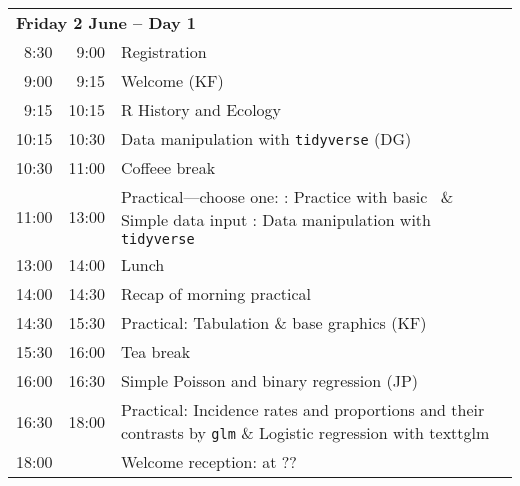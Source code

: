 \noindent
\begin{tabular}{r@{ -- }rp{13cm}}
\multicolumn{3}{l}{\bf Friday 2 June -- Day 1} \\
 8:30 &  9:00 & Registration \\
 9:00 &  9:15 & Welcome (KF) \\
 9:15 & 10:15 & R History and Ecology\\%
10:15 & 10:30 & Data manipulation with \texttt{tidyverse} (DG) \\
10:30 & 11:00 & Coffeee break \\
11:00 & 13:00 & Practical---choose one: \newline
                1: Practice with basic \R\ \& Simple data input \newline
                2: Data manipulation with \texttt{tidyverse} \\

  
13:00 & 14:00 & Lunch \\
14:00 & 14:30 & Recap of morning practical \\
14:30 & 15:30 & Practical: Tabulation \& base graphics (KF)\\ %
15:30 & 16:00 & Tea break\\
16:00 & 16:30 & Simple Poisson and binary regression (JP)\\ %
16:30 & 18:00 & Practical: Incidence rates and proportions and their contrasts by \texttt{glm} \& Logistic regression with textt{glm}\\ 
18:00 &       & Welcome reception: at ?? \\[1em]
\end{tabular}

